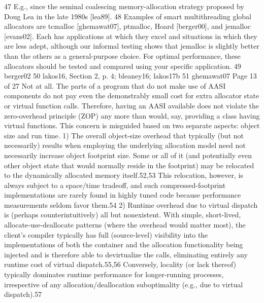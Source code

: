 47 E.g., since the seminal coalescing memory-allocation strategy proposed by Doug Lea in the late
1980s [lea89].
48 Examples of smart multithreading global allocators are tcmalloc [ghemawat07], ptmalloc, Hoard
[berger00], and jemalloc [evans02]. Each has applications at which they excel and situations in
which they are less adept, although our informal testing shows that jemalloc is slightly better than
the others as a general-purpose choice. For optimal performance, these allocators should be tested
and compared using your specific application.
49 berger02
50 lakos16, Section 2, p. 4; bleaney16; lakos17b
51 ghemawat07
Page 13 of 27
Not at all. The parts of a program that do not make use of AASI components do not
pay even the demonstrably small cost for extra allocator state or virtual function
calls. Therefore, having an AASI available does not violate the zero-overhead
principle (ZOP) any more than would, say, providing a class having virtual functions.
This concern is misguided based on two separate aspects: object size and run time.
1) The overall object-size overhead that typically (but not necessarily) results
when employing the underlying allocation model need not necessarily increase
object footprint size. Some or all of it (and potentially even other object state
that would normally reside in the footprint) may be relocated to the
dynamically allocated memory itself.52,53 This relocation, however, is always
subject to a space/time tradeoff, and such compressed-footprint
implementations are rarely found in highly tuned code because performance
measurements seldom favor them.54
2) Runtime overhead due to virtual dispatch is (perhaps counterintuitively) all
but nonexistent. With simple, short-lived, allocate-use-deallocate patterns
(where the overhead would matter most), the client’s compiler typically has
full (source-level) visibility into the implementations of both the container and
the allocation functionality being injected and is therefore able to devirtualize
the calls, eliminating entirely any runtime cost of virtual dispatch.55,56
Conversely, locality (or lack thereof) typically dominates runtime performance
for longer-running processes, irrespective of any allocation/deallocation
suboptimality (e.g., due to virtual dispatch).57

